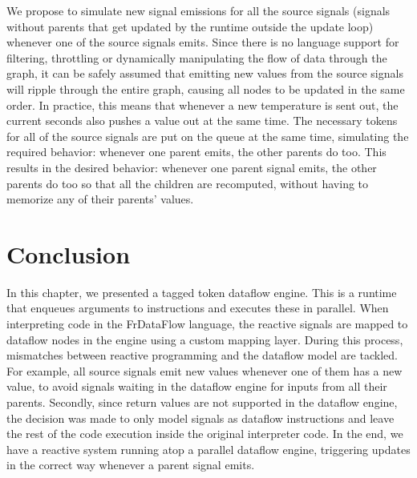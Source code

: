 We propose to simulate new signal emissions for all the source signals (signals without parents that get updated by the runtime outside the update loop) whenever one of the source signals emits. Since there is no language support for filtering, throttling or dynamically manipulating the flow of data through the graph, it can be safely assumed that emitting new values from the source signals will ripple through the entire graph, causing all nodes to be updated in the same order. In practice, this means that whenever a new temperature is sent out, the current seconds also pushes a value out at the same time. The necessary tokens for all of the source signals are put on the queue at the same time, simulating the required behavior: whenever one parent emits, the other parents do too. This results in the desired behavior: whenever one parent signal emits, the other parents do too so that all the children are recomputed, without having to memorize any of their parents' values. 

\section{Conclusion}

In this chapter, we presented a tagged token dataflow engine. This is a runtime that enqueues arguments to instructions and executes these in parallel. 
When interpreting code in the FrDataFlow language, the reactive signals are mapped to dataflow nodes in the engine using a custom mapping layer. During this process, mismatches between reactive programming and the dataflow model are tackled. For example, all source signals emit new values whenever one of them has a new value, to avoid signals waiting in the dataflow engine for inputs from all their parents. Secondly, since return values are not supported in the dataflow engine, the decision was made to only model signals as dataflow instructions and leave the rest of the code execution inside the original interpreter code. 
In the end, we have a reactive system running atop a parallel dataflow engine, triggering updates in the correct way whenever a parent signal emits. 





